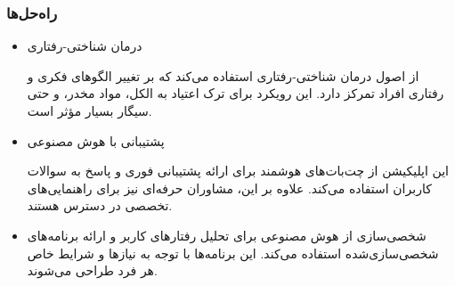 \documentclass[dvipsnames, svgnames, x11names, 11pt]{article}
\begin{document}
\subsubsection{راه‌حل‌ها}
\begin{itemize}
\item 
درمان شناختی-رفتاری 

از اصول درمان شناختی-رفتاری استفاده می‌کند که بر تغییر الگوهای فکری و رفتاری افراد تمرکز دارد. این رویکرد برای ترک اعتیاد به الکل، مواد مخدر، و حتی سیگار بسیار مؤثر است.

\item 
پشتیبانی با هوش مصنوعی

این اپلیکیشن از چت‌بات‌های هوشمند برای ارائه پشتیبانی فوری و پاسخ به سوالات کاربران استفاده می‌کند. علاوه بر این، مشاوران حرفه‌ای نیز برای راهنمایی‌های تخصصی در دسترس هستند.

\item 
شخصی‌سازی
از هوش مصنوعی برای تحلیل رفتارهای کاربر و ارائه برنامه‌های شخصی‌سازی‌شده استفاده می‌کند. این برنامه‌ها با توجه به نیازها و شرایط خاص هر فرد طراحی می‌شوند.
\end{itemize}
\end{document}
